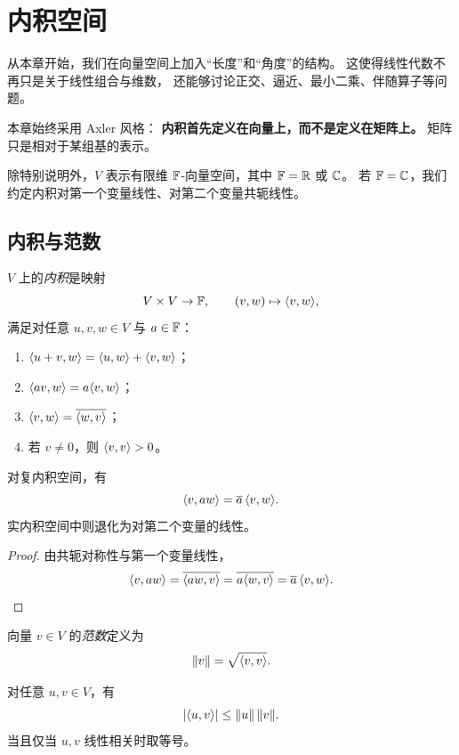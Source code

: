 \chapter{内积空间}

从本章开始，我们在向量空间上加入“长度”和“角度”的结构。
这使得线性代数不再只是关于线性组合与维数，
还能够讨论正交、逼近、最小二乘、伴随算子等问题。

本章始终采用 Axler 风格：
\textbf{内积首先定义在向量上，而不是定义在矩阵上。}
矩阵只是相对于某组基的表示。

除特别说明外，$V$ 表示有限维 $\mathbb{F}$-向量空间，其中 $\mathbb{F}=\mathbb{R}$ 或 $\mathbb{C}$。
若 $\mathbb{F}=\mathbb{C}$，我们约定内积对第一个变量线性、对第二个变量共轭线性。

\section{内积与范数}

\begin{definition}
$V$ 上的\emph{内积}是映射
\[
V\times V\to\mathbb{F},
\qquad (v,w)\mapsto \langle v, w \rangle,
\]
满足对任意 $u,v,w\in V$ 与 $a\in\mathbb{F}$：
\begin{enumerate}[label=(\alph*)]
\item $\langle u+v, w \rangle=\langle u, w \rangle+\langle v, w \rangle$；
\item $\langle av, w \rangle=a\langle v, w \rangle$；
\item $\langle v, w \rangle=\overline{\langle w, v \rangle}$；
\item 若 $v\neq 0$，则 $\langle v, v \rangle>0$。
\end{enumerate}
\end{definition}

\begin{proposition}
对复内积空间，有
\[
\langle v, aw \rangle=\overline a\,\langle v, w \rangle.
\]
实内积空间中则退化为对第二个变量的线性。
\end{proposition}

\begin{proof}
由共轭对称性与第一个变量线性，
\[
\langle v, aw \rangle=\overline{\langle aw, v \rangle}=\overline{a\langle w, v \rangle}=\overline a\,\langle v, w \rangle.
\]
\end{proof}

\begin{definition}
向量 $v\in V$ 的\emph{范数}定义为
\[
\|v\|=\sqrt{\langle v, v \rangle}.
\]
\end{definition}

\begin{theorem}
对任意 $u,v\in V$，有
\[
|\langle u, v \rangle|\le \|u\|\,\|v\|.
\]
当且仅当 $u,v$ 线性相关时取等号。
\end{theorem}

